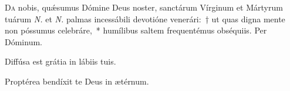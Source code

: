 \documentclass[vesperale_romanum.tex]{subfiles}
\begin{document}
\oratio

\lettrine{D}{a} nobis, quǽsumus Dómine Deus noster, sanctárum Vírginum et Mártyrum tuárum \textit{N.} et \textit{N.} palmas incessábili devotióne venerári:~† ut quas digna mente non póssumus celebráre,~* humílibus saltem frequentémus obséquiis. Per Dóminum.


\omniapraeter %

\vv Diffúsa est grátia in lábiis tuis. \tpalleluia

\rr Proptérea bendíxit te Deus in ætérnum. \tpalleluia
\label{an_veni_sponsa_christi_ii_vesperis_solesmes_1961}
{}
\end{document}
